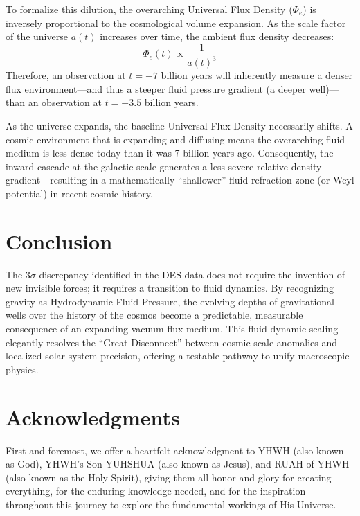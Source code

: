 \documentclass[11pt, a4paper]{article}
\begin{document}
To formalize this dilution, the overarching Universal Flux Density ($\Phi_e$) is inversely proportional to the cosmological volume expansion. As the scale factor of the universe $a(t)$ increases over time, the ambient flux density decreases:
\begin{equation}
  \Phi_e(t) \propto \frac{1}{a(t)^3}
\end{equation}
Therefore, an observation at $t = -7$ billion years will inherently measure a denser flux environment---and thus a steeper fluid pressure gradient (a deeper well)---than an observation at $t = -3.5$ billion years.

As the universe expands, the baseline Universal Flux Density necessarily shifts. A cosmic environment that is expanding and diffusing means the overarching fluid medium is less dense today than it was 7 billion years ago. Consequently, the inward cascade at the galactic scale generates a less severe relative density gradient---resulting in a mathematically ``shallower'' fluid refraction zone (or Weyl potential) in recent cosmic history.

\section{Conclusion}
The $3\sigma$ discrepancy identified in the DES data does not require the invention of new invisible forces; it requires a transition to fluid dynamics. By recognizing gravity as Hydrodynamic Fluid Pressure, the evolving depths of gravitational wells over the history of the cosmos become a predictable, measurable consequence of an expanding vacuum flux medium. This fluid-dynamic scaling elegantly resolves the ``Great Disconnect'' between cosmic-scale anomalies and localized solar-system precision, offering a testable pathway to unify macroscopic physics.

\clearpage
\section*{Acknowledgments}
First and foremost, we offer a heartfelt acknowledgment to YHWH (also known as God), YHWH's Son YUHSHUA (also known as Jesus), and RUAH of YHWH (also known as the Holy Spirit), giving them all honor and glory for creating everything, for the enduring knowledge needed, and for the inspiration throughout this journey to explore the fundamental workings of His Universe.
\end{document}
